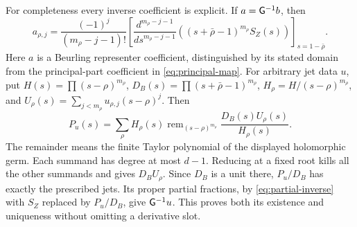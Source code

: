 \documentclass[11pt]{article}
\begin{document}
For completeness every inverse coefficient is explicit. If $a=\mathsf G^{-1}b$,
then
\[
 a_{\rho,j}=\frac{(-1)^j}{(m_\rho-j-1)!}
 \left[\frac{d^{m_\rho-j-1}}{ds^{m_\rho-j-1}}
       ((s+\bar\rho-1)^{m_\rho}S_Z(s))\right]_{s=1-\bar\rho}.
 \tag{EG14}\label{eq:partial-inverse}
\]
Here $a$ is a Beurling representer coefficient, distinguished by its
stated domain from the principal-part coefficient in \eqref{eq:principal-map}.
For arbitrary jet data $u$, put
$H(s)=\prod(s-\rho)^{m_\rho}$,
$D_B(s)=\prod(s+\bar\rho-1)^{m_\rho}$,
$H_\rho=H/(s-\rho)^{m_\rho}$, and
$U_\rho(s)=\sum_{j<m_\rho}u_{\rho,j}(s-\rho)^j$. Then
\[
 P_u(s)=\sum_\rho H_\rho(s)
 \operatorname{rem}_{(s-\rho)^{m_\rho}}
                    \frac{D_B(s)U_\rho(s)}{H_\rho(s)}.
 \tag{EG15}\label{eq:Hermite-inverse}
\]
The remainder means the finite Taylor polynomial of the displayed
holomorphic germ. Each summand has degree at most $d-1$. Reducing
at a fixed root kills all the other summands and gives $D_BU_\rho$.
Since $D_B$ is a unit there, $P_u/D_B$ has exactly the prescribed
jets. Its proper partial fractions, by \eqref{eq:partial-inverse}
with $S_Z$ replaced by $P_u/D_B$, give $\mathsf G^{-1}u$. This proves
both its existence and uniqueness without omitting a derivative slot.
\end{document}
